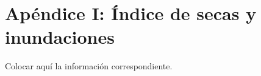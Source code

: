 \appendix{}
\renewcommand{\appendixname}{Apéndices}
\renewcommand{\appendixtocname}{Apéndices}
\renewcommand{\appendixpagename}{Apéndices}
\clearpage
\addappheadtotoc
\appendixpage

\chapter{Apéndice I: Índice de secas y inundaciones}
\label{apendiceI}

Colocar aquí la información correspondiente.





